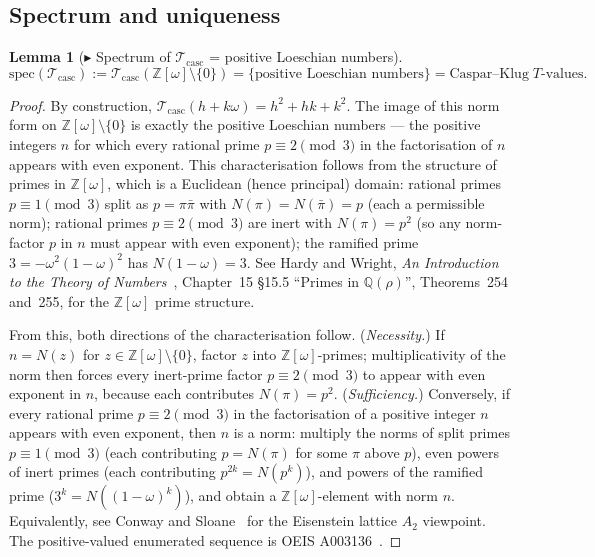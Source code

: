 \documentclass[12pt]{article}
\newtheorem{lemma}[theorem]{Lemma}
\newcommand{\Tcasc}{\mathcal{T}_{\mathrm{casc}}}
\newcommand{\Zom}{\mathbb{Z}[\omega]}
\begin{document}
\subsection{Spectrum and uniqueness}

\begin{lemma}[$\blacktriangleright$ Spectrum of $\Tcasc$ = positive Loeschian numbers]\label{lem:L1}
\[
\mathrm{spec}(\Tcasc) := \Tcasc(\Zom\setminus\{0\})
= \{\text{positive Loeschian numbers}\}
= \text{Caspar--Klug}\;T\text{-values}.
\]
\end{lemma}

\begin{proof}
By construction, $\Tcasc(h + k\omega) = h^2 + hk + k^2$. The image
of this norm form on $\Zom\setminus\{0\}$ is exactly the positive
Loeschian numbers — the positive integers $n$ for which every
rational prime $p \equiv 2\pmod 3$ in the factorisation of $n$
appears with even exponent. This characterisation follows from the
structure of primes in $\Zom$, which is a Euclidean (hence
principal) domain: rational primes $p \equiv 1\pmod 3$ split as
$p = \pi\bar{\pi}$ with $N(\pi) = N(\bar{\pi}) = p$ (each a
permissible norm); rational primes $p \equiv 2\pmod 3$ are inert
with $N(\pi) = p^2$ (so any norm-factor $p$ in $n$ must appear with
even exponent); the ramified prime $3 = -\omega^2(1 - \omega)^2$
has $N(1 - \omega) = 3$. See Hardy and Wright,
\emph{An Introduction to the Theory of Numbers}~\cite{HardyWright},
Chapter~15 \S15.5 ``Primes in $\mathbb{Q}(\rho)$'', Theorems~254
and~255, for the $\Zom$ prime structure.

From this, both directions of the characterisation follow.
(\emph{Necessity.}) If $n = N(z)$ for $z \in \Zom\setminus\{0\}$,
factor $z$ into $\Zom$-primes; multiplicativity of the norm then
forces every inert-prime factor $p \equiv 2\pmod 3$ to appear with
even exponent in $n$, because each contributes $N(\pi) = p^2$.
(\emph{Sufficiency.}) Conversely, if every rational prime
$p \equiv 2\pmod 3$ in the factorisation of a positive integer $n$
appears with even exponent, then $n$ is a norm: multiply the norms
of split primes $p \equiv 1\pmod 3$ (each contributing $p = N(\pi)$
for some $\pi$ above $p$), even powers of inert primes (each
contributing $p^{2k} = N(p^k)$), and powers of the ramified prime
($3^k = N((1-\omega)^k)$), and obtain a $\Zom$-element with norm
$n$. Equivalently, see Conway and Sloane~\cite[Ch.\,4 \S4.5]{ConwaySloane}
for the Eisenstein lattice $A_2$ viewpoint. The positive-valued
enumerated sequence is OEIS A003136~\cite{OEIS-A003136}.
\end{proof}
\end{document}
